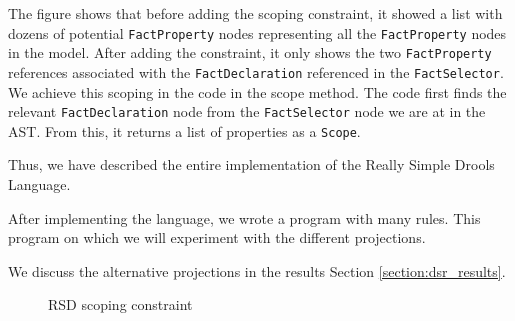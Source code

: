 The figure shows that before adding the scoping constraint, it showed a list with dozens of potential \linebreak\texttt{FactProperty} nodes representing all the \texttt{FactProperty} nodes in the model.
After adding the constraint, it only shows the two \texttt{FactProperty} references associated with the \texttt{FactDeclaration} referenced in the \texttt{FactSelector}.
We achieve this scoping in the code in the scope method.
The code first finds the relevant \texttt{FactDeclaration} node from the \texttt{FactSelector} node we are at in the AST.
From this, it returns a list of properties as a \texttt{Scope}.

Thus, we have described the entire implementation of the Really Simple Drools Language.

After implementing the language, we wrote a program with many rules.
This program on which we will experiment with the different projections.

We discuss the alternative projections in the results Section \ref{section:dsr_results}.

\begin{figure}[H]
    \centering
    \caption{RSD scoping constraint}
    \label{fig:RSDConstraint}
\end{figure}

